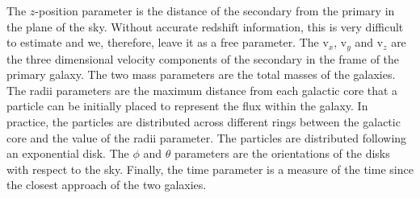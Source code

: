 \begin{table}
\centering
{}
\caption{The thirteen parameters used in both \texttt{JSPAM} and \texttt{APySPAM} to recreate an interaction. Each of these parameters must be found to consider an interaction constrained. The Parameter column shows how each parameter will be described throughout the rest of this paper. The third column then gives the conversion required to go from simulation units to SI units.}
\label{tab:parameters}
\end{table}

The $z$-position parameter is the distance of the secondary from the primary in the plane of the sky. Without accurate redshift information, this is very difficult to estimate and we, therefore, leave it as a free parameter. The v$_{x}$, v$_{y}$ and v$_{z}$ are the three dimensional velocity components of the secondary in the frame of the primary galaxy. The two mass parameters are the total masses of the galaxies. The radii parameters are the maximum distance from each galactic core that a particle can be initially placed to represent the flux within the galaxy. In practice, the particles are distributed across different rings between the galactic core and the value of the radii parameter. The particles are distributed following an exponential disk. The $\phi$ and $\theta$ parameters are the orientations of the disks with respect to the sky. Finally, the time parameter is a measure of the time since the closest approach of the two galaxies.

